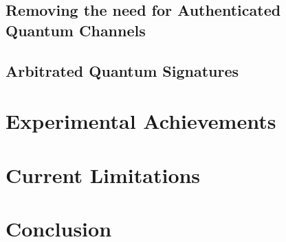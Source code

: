 \documentclass[%
 reprint,
 amsmath,amssymb,
 aps,
 pra,
]{revtex4-1}
\begin{document}
\subsection{Removing the need for Authenticated Quantum Channels}

\subsection{Arbitrated Quantum Signatures}

\section{Experimental Achievements}

\section{Current Limitations}

\section{Conclusion}

\end{document}

